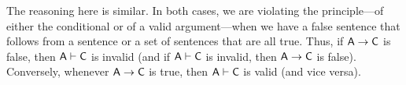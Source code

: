 The reasoning here is similar. In both cases, we are violating the principle---of either the conditional or of a valid argument---when we have a false sentence that follows from a sentence or a set of sentences that are all true. Thus, if $\mathsf{A} \rightarrow \mathsf{C}$ is false, then $\mathsf{A} \vdash \mathsf{C}$ is invalid (and if $\mathsf{A} \vdash \mathsf{C}$ is invalid, then $\mathsf{A} \rightarrow \mathsf{C}$ is false). Conversely, whenever $\mathsf{A} \rightarrow \mathsf{C}$ is true, then $\mathsf{A} \vdash \mathsf{C}$ is valid (and vice versa). 


\begin{comment}
\section{The limits of this type of analysis}\label{s:ParadoxesOfMaterialConditional}

We have seen in chapters \ref{s:SemanticConcepts} and \ref{c:tt-validity} that truth tables are a useful tool for analyzing sentences---whether those are individual sentences, pairs of sentences, or arguments. There are limitations to this type of analysis, however, and it worth understanding some of those limitations.

First, consider this argument:
	\begin{earg}
		\item Daisy has four legs.\\ 
		Therefore, Daisy has more than two legs.
	\end{earg}
To symbolize this argument in TFL, we would have to use two different atomic sentences---perhaps `$F$' for the premise  and `$T$' for the conclusion. The English version of this argument is clearly valid, but `$F \proves T$' is just as clearly invalid. 
\begin{center}
\begin{tabular}{d d | f e e}
$F$& $T$&  $T$& $\proves$& $F$\\ 
\hline
T& T& T&\cm&  T\Tstrut\\ 
T& F& F&\cm&  T\\ 
F& T& T&\xm&  F\\ 
F& F& F&\cm&  F\\
\end{tabular}
\end{center} 
Hence, we should keep in mind that while some English sentences can be effectively translated into TFL, not all can be.


\end{comment}
